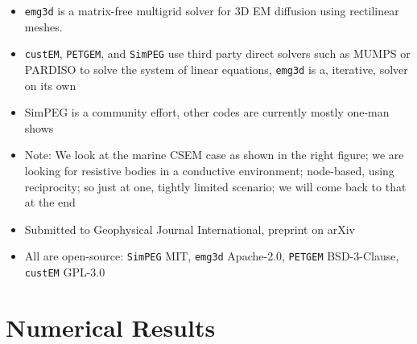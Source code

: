 \documentclass[xcolor=svgnames, aspectratio=169]{beamer}
\newcommand{\emg}[2]{\texttt{emg#1#2}\xspace}
\newcommand{\simpeg}{\texttt{SimPEG}\xspace}
\newcommand{\custem}{\texttt{custEM}\xspace}
\newcommand{\petgem}{\texttt{PETGEM}\xspace}
\begin{document}
\begin{frame}[c]
{\begin{itemize}
        $f$-domain; controlled- and natural-src),\\ and more; contains
        1D, 2D, and 3D rectilinear, curvilinear, and octree meshes
      \item \emg3d is a matrix-free multigrid solver for 3D EM diffusion using
        rectilinear meshes.
      \item \custem, \petgem, and \simpeg use third party direct solvers such
        as MUMPS or PARDISO to solve the system of linear equations, \emg3d is
        a, iterative, solver on its own
      \item SimPEG is a community effort, other codes are currently mostly
        one-man shows
      \item Note: We look at the marine CSEM case as shown in the right figure;
        we are looking for resistive bodies in a conductive environment;
        node-based, using reciprocity; so just at one, tightly limited
        scenario; we will come back to that at the end
      \item Submitted to Geophysical Journal International, preprint on arXiv
      \item All are open-source: \simpeg MIT, \emg3d Apache-2.0, \petgem
        BSD-3-Clause, \custem GPL-3.0
    \end{itemize}
  }
\end{frame}

\section{Numerical Results} %
\end{document}
